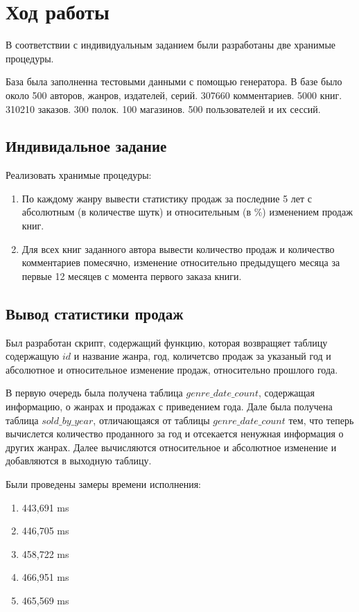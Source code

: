 \documentclass[a4paper,14pt]{extarticle}
\begin{document}
\section{Ход работы}
В соответствии с индивидуальным заданием были разработаны две хранимые процедуры.

База была заполненна тестовыми данными с помощью генератора.
В базе было около 500 авторов, жанров, издателей, серий. 307660 комментариев. 5000 книг. 310210 заказов. 300 полок. 100 магазинов. 500 пользователей и их сессий.


\subsection{Индивидальное задание}
Реализовать хранимые процедуры:
\begin{enumerate}
	\item По каждому жанру вывести статистику продаж за последние 5 лет с абсолютным (в количестве шутк) и относительным (в \%) изменением продаж книг.
	\item Для всех книг заданного автора вывести количество продаж и количество комментариев помесячно, изменение относительно предыдущего месяца за первые 12 месяцев с момента первого заказа книги.
\end{enumerate}

\subsection{Вывод статистики продаж}
Был разработан скрипт, содержащий функцию,
которая возвращяет таблицу содержащую $id$
и название жанра, год, количетсво продаж за указаный год
и абсолютное и относительное изменение продаж,
относительно прошлого года. 



В первую очередь была получена таблица $genre\_date\_count$,
содержащая информацию, о жанрах и продажах с приведением года.
Дале была получена таблица $sold\_by\_year$,
отличающаяся от таблицы $genre\_date\_count$ тем,
что теперь вычислется количество проданного за год 
и отсекается ненужная информация о других жанрах.
Далее вычисляются относительное и абсолютное изменение
и добавляются в выходную таблицу.

Были проведены замеры времени исполнения:
\begin{enumerate}
	\item 443,691 ms
	\item 446,705 ms
	\item 458,722 ms
	\item 466,951 ms
	\item 465,569 ms
\end{enumerate}
\end{document}
